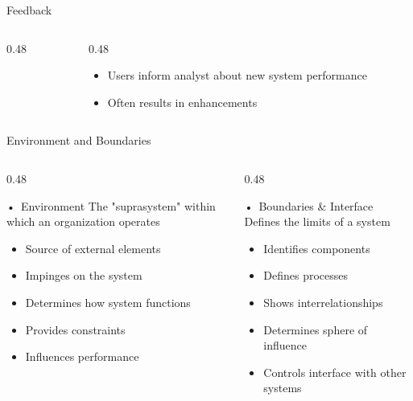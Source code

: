 \documentclass[aspectratio=169]{beamer}
\begin{document}
\begin{frame}{Feedback}
\begin{columns}
\begin{column}{0.48\textwidth}
        \end{column} 

\begin{column}{0.48\textwidth}  

    \begin{itemize}
        \item Users inform analyst about new system performance
        \item Often results in enhancements
    \end{itemize} 
        
   \end{column}
\end{columns}
        
    
\end{frame}

\begin{frame}{Environment and Boundaries}
    \begin{columns}
        \begin{column}{0.48\textwidth}
            \begin{block}{•\, Environment}
                The "suprasystem" within which an organization operates
                \begin{itemize}
                    \item Source of external elements
                    \item Impinges on the system
                    \item Determines how system functions
                    \item Provides constraints
                    \item Influences performance
                \end{itemize}
            \end{block}
        \end{column}
        \begin{column}{0.48\textwidth}
            \begin{block}{•\, Boundaries \& Interface}
                Defines the limits of a system
                \begin{itemize}
                    \item Identifies components
                    \item Defines processes
                    \item Shows interrelationships
                    \item Determines sphere of influence
                    \item Controls interface with other systems
                \end{itemize}
            \end{block}
        \end{column}
    \end{columns}
    

\end{frame}
\end{document}
